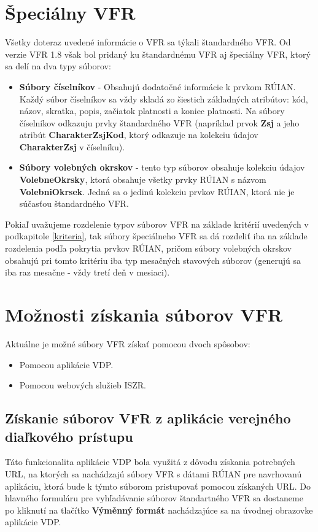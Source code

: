 \section {Špeciálny VFR}
Všetky doteraz uvedené informácie o VFR sa týkali štandardného VFR. Od verzie VFR 1.8 však bol pridaný ku štandardnému VFR aj špeciálny VFR, ktorý sa delí na dva typy súborov:
\begin{itemize}
    \item {{\bf Súbory číselníkov} - Obsahujú dodatočné informácie k prvkom RÚIAN. Každý súbor číselníkov sa vždy skladá zo šiestich základných atribútov: kód, názov, skratka, popis, začiatok platnosti a koniec platnosti. Na súbory číselníkov odkazuju prvky štandardného VFR (napríklad prvok {\bf Zsj} a jeho atribút {\bf CharakterZsjKod}, ktorý odkazuje na kolekciu údajov {\bf CharakterZsj} v číselníku).}
    \item{{\bf Súbory volebných okrskov} - tento typ súborov obsahuje kolekciu údajov {\bf VolebneOkrsky}, ktorá obsahuje všetky prvky RÚIAN s názvom {\bf VolebniOkrsek}. Jedná sa o jedinú kolekciu prvkov RÚIAN, ktorá nie je súčasťou štandardného VFR. }
\end{itemize}
Pokiaľ uvažujeme rozdelenie typov súborov VFR na základe kritérií uvedených v podkapitole \ref{kriteria}, tak súbory špeciálneho VFR sa dá rozdeliť iba na základe rozdelenia podľa pokrytia prvkov RÚIAN, pričom súbory volebných okrskov obsahujú pri tomto kritériu iba typ mesačných stavových súborov (generujú sa iba raz mesačne - vždy tretí deň v mesiaci).
\section {Možnosti získania súborov VFR}
Aktuálne je možné súbory VFR získať pomocou dvoch spôsobov:
\begin{itemize}
    \item {Pomocou aplikácie VDP.}
    \item{Pomocou webových služieb ISZR.}
\end{itemize}
\subsection{Získanie súborov VFR z aplikácie verejného diaľkového prístupu}
Táto funkcionalita aplikácie VDP bola využitá z dôvodu získania potrebných URL, na ktorých sa nachádzajú súbory VFR s dátami RÚIAN pre navrhovanú aplikáciu, ktorá bude k týmto súborom pristupovať pomocou získaných URL. Do hlavného formuláru pre vyhľadávanie súborov štandartného VFR sa dostaneme po kliknutí na tlačítko {\bf Výměnný formát} nachádzajúce sa na úvodnej obrazovke aplikácie VDP.

